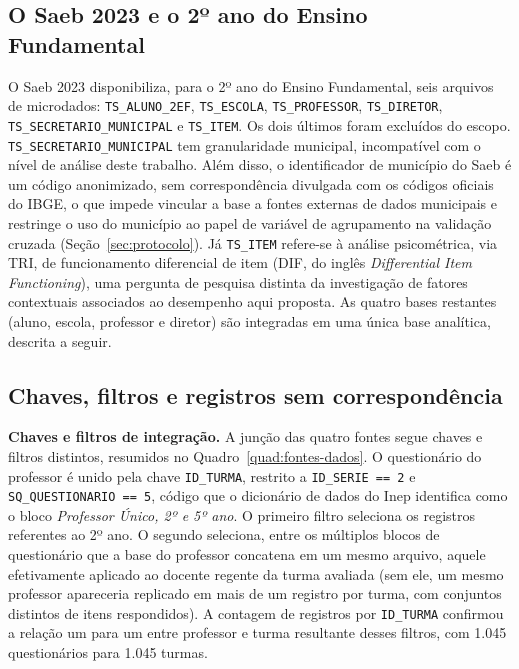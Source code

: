 \subsection{O Saeb 2023 e o 2º ano do Ensino Fundamental}

O Saeb 2023 disponibiliza, para o 2º ano do Ensino
Fundamental, seis arquivos de microdados: \texttt{TS\_ALUNO\_2EF},
\texttt{TS\_ESCOLA}, \texttt{TS\_PROFESSOR}, \texttt{TS\_DIRETOR},
\texttt{TS\_SECRETARIO\_\allowbreak MUNICIPAL} e \texttt{TS\_ITEM}.
Os dois últimos foram excluídos do escopo.
\texttt{TS\_\allowbreak SECRETARIO\_MUNICIPAL} tem granularidade municipal,
incompatível com o nível de análise deste trabalho. Além disso, o
identificador de município do Saeb é um código anonimizado, sem
correspondência divulgada com os códigos oficiais do IBGE, o que impede
vincular a base a fontes externas de dados municipais e restringe o uso do
município ao papel de variável de agrupamento na validação cruzada
(Seção~\ref{sec:protocolo}). Já \texttt{TS\_ITEM} refere-se à análise
psicométrica, via TRI, de funcionamento diferencial de item (DIF, do inglês
\textit{Differential Item Functioning}), uma pergunta de pesquisa distinta
da investigação de fatores contextuais associados ao desempenho aqui
proposta. As quatro bases restantes (aluno, escola, professor e diretor)
são integradas em uma única base analítica, descrita a seguir.

\subsection{Chaves, filtros e registros sem correspondência}

\textbf{Chaves e filtros de integração.} A junção das quatro fontes segue
chaves e filtros distintos, resumidos no Quadro~\ref{quad:fontes-dados}. O
questionário do professor é unido pela chave \texttt{ID\_TURMA},
restrito a \texttt{ID\_SERIE~==~2} e \texttt{SQ\_QUESTIONARIO~==~5}, código
que o dicionário de dados do Inep identifica como o bloco \emph{Professor
Único, 2º e 5º ano}. O primeiro filtro seleciona os registros referentes ao
2º ano. O segundo seleciona, entre os múltiplos blocos de
questionário que a base do professor concatena em um mesmo arquivo, aquele
efetivamente aplicado ao docente regente da turma avaliada (sem ele, um
mesmo professor apareceria replicado em mais de um registro por turma, com
conjuntos distintos de itens respondidos). A contagem de registros
por \texttt{ID\_TURMA} confirmou a relação um para um entre professor e
turma resultante desses filtros, com 1.045 questionários para 1.045
turmas.

